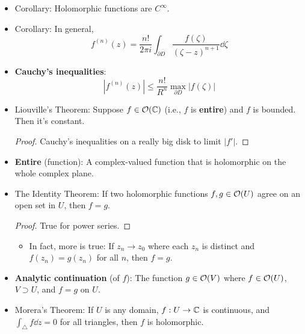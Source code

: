 \documentclass[../notes.tex]{subfiles}
\begin{document}
\begin{itemize}
    \begin{proof}
        Define the helper function
        \begin{equation*}
            g(\zeta) =
            \begin{cases}
                \frac{f(\zeta)-f(z)}{\zeta-z} & \zeta\neq z\\
                f'(z) & \zeta=z
            \end{cases}
        \end{equation*}
        It integrates to zero on $\partial D$ and then splits into the two sides of the CIF.
    \end{proof}
    \item Corollary: Holomorphic functions are $C^\infty$.
    \item Corollary: In general,
    \begin{equation*}
        f^{(n)}(z) = \frac{n!}{2\pi i}\int_{\partial D}\frac{f(\zeta)}{(\zeta-z)^{n+1}}\dd\zeta
    \end{equation*}
    \item \textbf{Cauchy's inequalities}:
    \begin{equation*}
        |f^{(n)}(z)| \leq \frac{n!}{R^n}\max_{\partial D}|f(\zeta)|
    \end{equation*}
    \item Liouville's Theorem: Suppose $f\in\mathcal{O}(\mathbb{C})$ (i.e., $f$ is \textbf{entire}) and $f$ is bounded. Then it's constant.
    \begin{proof}
        Cauchy's inequalities on a really big disk to limit $|f'|$.
    \end{proof}
    \item \textbf{Entire} (function): A complex-valued function that is holomorphic on the whole complex plane.
    \item The Identity Theorem: If two holomorphic functions $f,g\in\mathcal{O}(U)$ agree on an open set in $U$, then $f=g$.
    \begin{proof}
        True for power series.
    \end{proof}
    \begin{itemize}
        \item In fact, more is true: If $z_n\to z_0$ where each $z_n$ is distinct and $f(z_n)=g(z_n)$ for all $n$, then $f=g$.
    \end{itemize}
    \item \textbf{Analytic continuation} (of $f$): The function $g\in\mathcal{O}(V)$ where $f\in\mathcal{O}(U)$, $V\supset U$, and $f=g$ on $U$.
    \item Morera's Theorem: If $U$ is any domain, $f:U\to\mathbb{C}$ is continuous, and $\int_\triangle f\dd{z}=0$ for all triangles, then $f$ is holomorphic.

\end{itemize}
\end{document}
